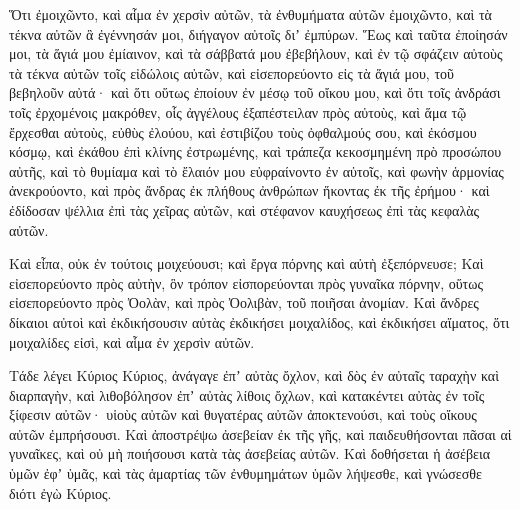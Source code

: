 {Ὅτι ἐμοιχῶντο, καὶ αἷμα ἐν χερσὶν αὐτῶν, τὰ ἐνθυμήματα αὐτῶν ἐμοιχῶντο, καὶ τὰ τέκνα αὐτῶν ἃ ἐγέννησάν μοι, διήγαγον αὐτοῖς διʼ ἐμπύρων.
Ἕως καὶ ταῦτα ἐποίησάν μοι, τὰ ἅγιά μου ἐμίαινον, καὶ τὰ σάββατά μου ἐβεβήλουν,
καὶ ἐν τῷ σφάζειν αὐτοὺς τὰ τέκνα αὐτῶν τοῖς εἰδώλοις αὐτῶν, καὶ εἰσεπορεύοντο εἰς τὰ ἅγιά μου, τοῦ βεβηλοῦν αὐτά· καὶ ὅτι οὕτως ἐποίουν ἐν μέσῳ τοῦ οἴκου μου,
καὶ ὅτι τοῖς ἀνδράσι τοῖς ἐρχομένοις μακρόθεν, οἷς ἀγγέλους ἐξαπέστειλαν πρὸς αὐτοὺς, καὶ ἅμα τῷ ἔρχεσθαι αὐτοὺς, εὐθὺς ἐλούου, καὶ ἐστιβίζου τοὺς ὀφθαλμούς σου, καὶ ἐκόσμου κόσμῳ,
καὶ ἐκάθου ἐπὶ κλίνης ἐστρωμένης, καὶ τράπεζα κεκοσμημένη πρὸ προσώπου αὐτῆς, καὶ τὸ θυμίαμα καὶ τὸ ἔλαιόν μου εὐφραίνοντο ἐν αὐτοῖς,
καὶ φωνὴν ἁρμονίας ἀνεκρούοντο, καὶ πρὸς ἄνδρας ἐκ πλήθους ἀνθρώπων ἥκοντας ἐκ τῆς ἐρήμου· καὶ ἐδίδοσαν ψέλλια ἐπὶ τὰς χεῖρας αὐτῶν, καὶ στέφανον καυχήσεως ἐπὶ τὰς κεφαλὰς αὐτῶν.
\par }{\PP {}Καὶ εἶπα, οὐκ ἐν τούτοις μοιχεύουσι; καὶ ἔργα πόρνης καὶ αὐτὴ ἐξεπόρνευσε;
Καὶ εἰσεπορεύοντο πρὸς αὐτὴν, ὃν τρόπον εἰσπορεύονται πρὸς γυναῖκα πόρνην, οὕτως εἰσεπορεύοντο πρὸς Ὀολὰν, καὶ πρὸς Ὀολιβὰν, τοῦ ποιῆσαι ἀνομίαν.
Καὶ ἄνδρες δίκαιοι αὐτοὶ καὶ ἐκδικήσουσιν αὐτὰς ἐκδικήσει μοιχαλίδος, καὶ ἐκδικήσει αἵματος, ὅτι μοιχαλίδες εἰσὶ, καὶ αἷμα ἐν χερσὶν αὐτῶν.
\par }{\PP {}Τάδε λέγει Κύριος Κύριος, ἀνάγαγε ἐπʼ αὐτὰς ὄχλον, καὶ δὸς ἐν αὐταῖς ταραχὴν καὶ διαρπαγὴν,
καὶ λιθοβόλησον ἐπʼ αὐτὰς λίθοις ὄχλων, καὶ κατακέντει αὐτὰς ἐν τοῖς ξίφεσιν αὐτῶν· υἱοὺς αὐτῶν καὶ θυγατέρας αὐτῶν ἀποκτενούσι, καὶ τοὺς οἴκους αὐτῶν ἐμπρήσουσι.
Καὶ ἀποστρέψω ἀσεβείαν ἐκ τῆς γῆς, καὶ παιδευθήσονται πᾶσαι αἱ γυναῖκες, καὶ οὐ μὴ ποιήσουσι κατὰ τὰς ἀσεβείας αὐτῶν.
Καὶ δοθήσεται ἡ ἀσέβεια ὑμῶν ἐφʼ ὑμᾶς, καὶ τὰς ἁμαρτίας τῶν ἐνθυμημάτων ὑμῶν λήψεσθε, καὶ γνώσεσθε διότι ἐγὼ Κύριος.

}
